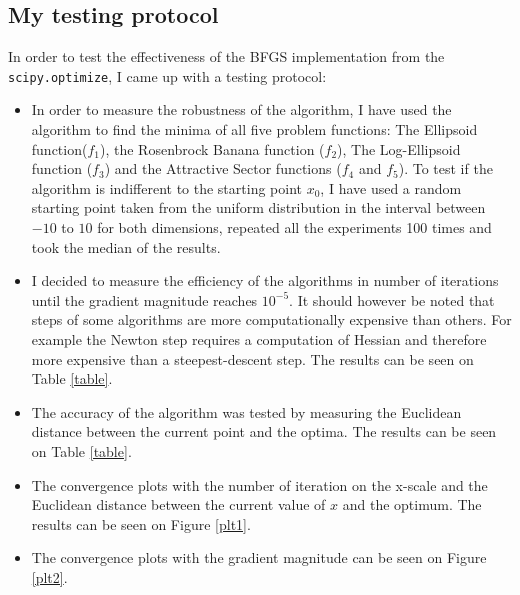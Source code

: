 \documentclass[a4paper]{article}
\begin{document}
\subsection{My testing protocol}
In order to test the effectiveness of the BFGS implementation from the
\texttt{scipy.optimize}, I came up with a testing protocol:
\begin{itemize}
\item In order to measure the robustness of the algorithm, I have used the
  algorithm to find the minima of all five problem functions: The Ellipsoid
  function($f_1$), the Rosenbrock Banana function ($f_2$), The Log-Ellipsoid
  function ($f_3$) and the Attractive Sector functions ($f_4$ and $f_5$).
  To test if the algorithm is indifferent to the starting point $x_0$, I have
  used a random starting point taken from the uniform distribution in the
  interval between $-10$ to $10$ for both dimensions,
  repeated all the experiments 100 times and took the median of the results.
\item I decided to measure the efficiency of the algorithms in number of
  iterations until the gradient magnitude reaches $10^{-5}$. It should however
  be noted that steps of some algorithms are more
  computationally expensive than others. For example the Newton step requires a
  computation of Hessian and therefore more expensive than a steepest-descent step.
  The results can be seen on Table \ref{table}.
\item The accuracy of the algorithm was tested by measuring the Euclidean distance
  between the current point and the optima. The results can be seen on Table \ref{table}.
\item The convergence plots with the number of iteration on the x-scale and the
  Euclidean distance between the current value of $x$ and the
  optimum. The results can be seen on Figure \ref{plt1}.
\item The convergence plots with the gradient magnitude
  can be seen on Figure \ref{plt2}.
\end{itemize}
\end{document}
